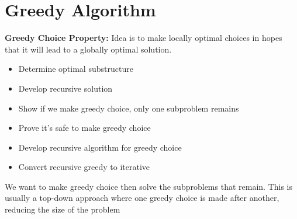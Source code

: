 \documentclass{article}
\begin{document}
  \section{Greedy Algorithm}
  \textbf{Greedy Choice Property: }Idea is to make locally optimal choices in hopes that it will lead to a globally optimal solution.
  \begin{itemize}[noitemsep]
    \item Determine optimal substructure
    \item Develop recursive solution 
    \item Show if we make greedy choice, only one subproblem remains
    \item Prove it's safe to make greedy choice
    \item Develop recursive algorithm for greedy choice
    \item Convert recursive greedy to iterative
  \end{itemize}
  We want to make greedy choice then solve the subproblems that remain. This is usually a top-down approach where one greedy choice is made after another, reducing the size of the problem
\end{document}
